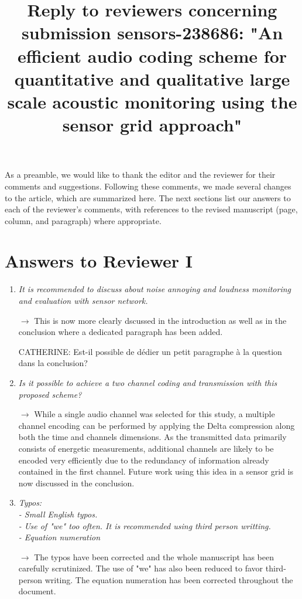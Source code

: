 \documentclass[10pt]{article}
\title{Reply to reviewers concerning submission sensors-238686: "An efficient audio coding scheme  for quantitative and qualitative large scale acoustic monitoring using the sensor grid approach"}
\begin{document}
\maketitle

As a preamble, we would like to thank the editor and the reviewer for their comments and suggestions. Following these comments, we made several changes to the article, which are summarized here. The next sections list our answers to each of the reviewer’s comments, with references to the revised manuscript (page, column, and paragraph) where appropriate.


\section{Answers to Reviewer I}

\begin{enumerate}

\item \emph{It is recommended to discuss about noise annoying and loudness monitoring and evaluation with sensor network.}

$\rightarrow$ This is now more clearly dscussed in the introduction as well as in the conclusion where a dedicated paragraph has been added.

CATHERINE: Est-il possible de dédier un petit paragraphe à la question dans la conclusion?

\item \emph{Is it possible to achieve a two channel coding and transmission with this proposed scheme?}

$\rightarrow$ While a single audio channel was selected for this study, a multiple channel encoding can be performed by applying the Delta compression along both the time and channels dimensions. As the transmitted data primarily consists of energetic measurements, additional channels are likely to be encoded very efficiently due to the redundancy of information already contained in the first channel. Future work using this idea in a sensor grid is now discussed in the conclusion.

\item \emph{Typos:\\
- Small English typos.\\
- Use of "we" too often. It is recommended using third person writting.\\
- Equation numeration}

$\rightarrow$ The typos have been corrected and the whole manuscript has been carefully scrutinized. The use of "we" has also been reduced to favor third-person writing. The equation numeration has been corrected throughout the document.

\end{enumerate}
\end{document}
